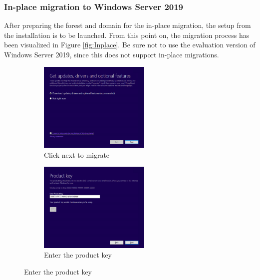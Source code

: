 \subsubsection{In-place migration to Windows Server 2019}
After preparing the forest and domain for the in-place migration, the setup from the installation is to be launched. From this point on, the migration process has been visualized in Figure \ref{fig:Inplace}. Be sure not to use the evaluation version of Windows Server 2019, since this does not support in-place migrations.
\begin{figure}[h]
	\begin{subfigure}{0.5\textwidth}
		\includegraphics[width=0.9\linewidth,height=4.3cm]{img/Methodologie/InPlace0.png}
		\captionsetup{width=0.8\linewidth}
		\centering		
		\caption{Click next to migrate}
	\end{subfigure}
	\begin{subfigure}{0.5\textwidth}
		\captionsetup{width=0.8\linewidth}
		\includegraphics[width=0.9\linewidth,height=4.3cm]{img/Methodologie/InPlace1.png}
		\centering
		\caption{Enter the product key}
	\end{subfigure}
\end{figure}
